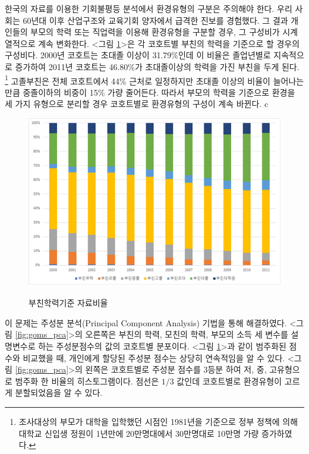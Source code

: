  한국의 자료를 이용한 기회불평등 분석에서 환경유형의 구분은 주의해야 한다. 우리 사회는 60년대 이후 산업구조와 교육기회 양자에서 급격한 진보를 경험했다. 그 결과 개인들의 부모의 학력 또는 직업력을 이용해 환경유형을 구분할 경우, 그 구성비가 시계열적으로 계속 변화한다.
 <그림 \ref{fig:goms_nratio_byedu}>은 각 코호트별 부친의 학력을 기준으로 할 경우의 구성비다.
  2000년 코호트는 초대졸 이상이 31.79\%인데 이 비율은 졸업년별로 지속적으로 증가하여 2011년 코호트는 46.80\%가 초대졸이상의 학력을 가진 부친을 두게 된다.
 \footnote{조사대상의 부모가 대학을 입학했던 시점인 1981년을 기준으로 정부 정책에 의해 대학교 신입생 정원이 1년만에 20만명대에서 30만명대로 10만명 가량 증가하였다.}
고졸부친은 전체 코호트에서 44\% 근처로 일정하지만 초대졸 이상의 비율이 늘어나는 만큼 중졸이하의 비중이 15\% 가량 줄어든다. 따라서 부모의 학력을 기준으로 환경을 세 가지 유형으로 분리할 경우 코호트별로 환경유형의 구성이 계속 바뀐다.
c
\begin{figure}
    \centering
    \caption{부친학력기준 자료비율}
    \includegraphics[width=\textwidth]{figure/goms_nratio_byedu.png}
    \label{fig:goms_nratio_byedu}
\end{figure}

이 문제는 주성분 분석(Principal Component Analysis) 기법을 통해 해결하였다.
<그림 \ref{fig:goms_pca}>의 오른쪽은 부친의 학력, 모친의 학력, 부모의 소득 세 변수를 설명변수로 하는 주성분점수의 값의 코호트별 분포이다.
 <그림 \ref{fig:goms_nratio_byedu}>과 같이 범주화된 점수와 비교했을 때, 개인에게 할당된 주성분 점수는 상당히 연속적임을 알 수 있다.
 <그림 \ref{fig:goms_pca}>의 왼쪽은 코호트별로 주성분 점수를 3등분 하여 저, 중, 고유형으로 범주화 한 비율의 히스토그램이다.
 점선은 $1/3$ 값인데 코호트별로 환경유형이 고르게 분할되었음을 알 수 있다.

